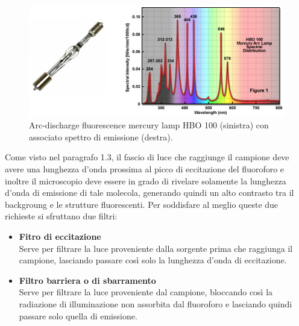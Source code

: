 \begin{figure}
 \centering
 \includegraphics[scale=.40]{img/CAP2lampadaquarzo.png}
 \caption{\small{Arc-discharge fluorescence mercury lamp HBO 100 (sinistra) con associato spettro di emissione (destra).}}
 \label{fig:lamp}
\end{figure}

Come visto nel paragrafo 1.3, il fascio di luce che raggiunge il campione deve avere una lunghezza d'onda prossima al picco di eccitazione del fluoroforo e inoltre il microscopio deve essere in grado di rivelare solamente la lunghezza d'onda di emissione di tale molecola, generando quindi un alto contrasto tra il backgroung e le strutture fluorescenti.
Per soddisfare al meglio queste due richieste si sfruttano due filtri:

\begin{itemize}
\item \textbf{Fitro di eccitazione}\\
Serve per filtrare la luce proveniente dalla sorgente prima che raggiunga il campione, lasciando passare così solo la lunghezza d'onda di eccitazione.

\item \textbf{Filtro barriera o di sbarramento}\\
Serve per filtrare la luce proveniente dal campione, bloccando così la radiazione di illuminazione non assorbita dal fluoroforo e lasciando quindi passare solo quella di emissione. 
\end{itemize}

